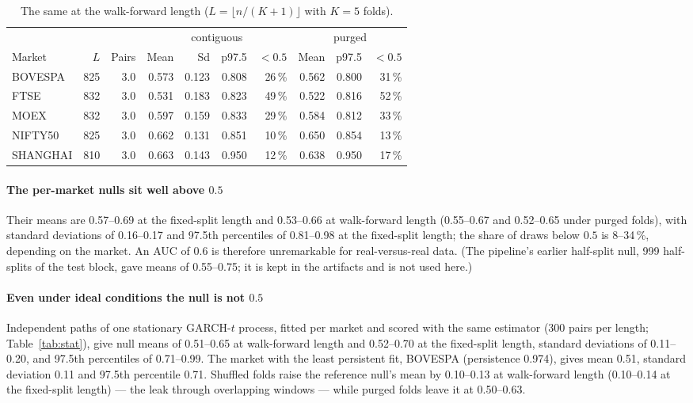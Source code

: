 \documentclass[11pt,a4paper]{article}
\makeatletter
\DeclareRobustCommand{\_}{\ifmmode\nfss@text{\textunderscore}\else\textunderscore\allowbreak\fi}
\makeatother
\begin{document}
\begin{table}[htbp]
\centering
\caption{The same at the walk-forward length ($L=\lfloor n/(K+1)\rfloor$ with $K=5$ folds).}
\label{tab:nullswf}
{\footnotesize
\setlength{\tabcolsep}{3.5pt}
\begin{tabular}{@{}lrrrrrrrrr@{}}
\toprule
 & & & \multicolumn{4}{c}{contiguous} & \multicolumn{3}{c}{purged} \\
\cmidrule(lr){4-7}\cmidrule(l){8-10}
Market & $L$ & Pairs & Mean & Sd & p97.5 & $<0.5$ & Mean & p97.5 & $<0.5$ \\
\midrule
BOVESPA & 825 & 3.0 & 0.573 & 0.123 & 0.808 & 26\,\% & 0.562 & 0.800 & 31\,\% \\
FTSE & 832 & 3.0 & 0.531 & 0.183 & 0.823 & 49\,\% & 0.522 & 0.816 & 52\,\% \\
MOEX & 832 & 3.0 & 0.597 & 0.159 & 0.833 & 29\,\% & 0.584 & 0.812 & 33\,\% \\
NIFTY50 & 825 & 3.0 & 0.662 & 0.131 & 0.851 & 10\,\% & 0.650 & 0.854 & 13\,\% \\
SHANGHAI & 810 & 3.0 & 0.663 & 0.143 & 0.950 & 12\,\% & 0.638 & 0.950 & 17\,\% \\
\bottomrule
\end{tabular}}
\end{table}

\paragraph{The per-market nulls sit well above $0.5$} Their means are 0.57--0.69 at the fixed-split length and 0.53--0.66 at walk-forward length (0.55--0.67 and 0.52--0.65 under purged folds), with standard deviations of 0.16--0.17 and 97.5th percentiles of 0.81--0.98 at the fixed-split length; the share of draws below $0.5$ is 8--34\,\%, depending on the market. An AUC of $0.6$ is therefore unremarkable for real-versus-real data. (The pipeline's earlier half-split null, 999 half-splits of the test block, gave means of 0.55--0.75; it is kept in the artifacts and is not used here.)

\paragraph{Even under ideal conditions the null is not $0.5$} Independent paths of one stationary GARCH-$t$ process, fitted per market and scored with the same estimator (300 pairs per length; Table~\ref{tab:stat}), give null means of 0.51--0.65 at walk-forward length and 0.52--0.70 at the fixed-split length, standard deviations of 0.11--0.20, and 97.5th percentiles of 0.71--0.99. The market with the least persistent fit, BOVESPA (persistence 0.974), gives mean 0.51, standard deviation 0.11 and 97.5th percentile 0.71. Shuffled folds raise the reference null's mean by 0.10--0.13 at walk-forward length (0.10--0.14 at the fixed-split length) --- the leak through overlapping windows --- while purged folds leave it at 0.50--0.63.
\end{document}
